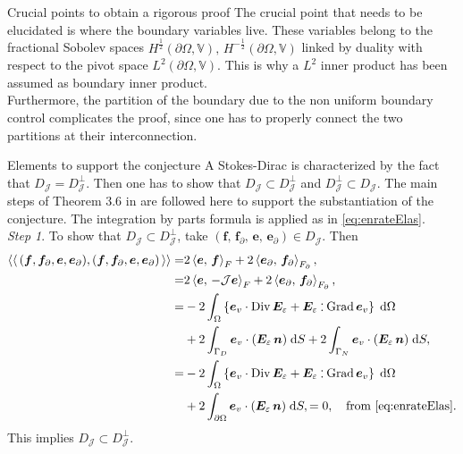\begin{conjecture}
\begin{paragraph}{Crucial points to obtain a rigorous proof}
	The crucial point that needs to be elucidated is where the boundary variables live. These variables belong to the fractional Sobolev spaces $H^{\frac{1}{2}}(\partial\Omega, \mathbb{V}), \, H^{-\frac{1}{2}}(\partial\Omega, \mathbb{V})$ linked by duality with respect to the pivot space $L^2(\partial\Omega, \mathbb{V})$. This is why a $L^2$ inner product has been assumed as boundary inner product. \\
	Furthermore, the partition of the boundary due to the non uniform boundary control complicates the proof, since one has to properly connect the two partitions at their interconnection.
\end{paragraph}
\begin{paragraph}{Elements to support the conjecture}
A Stokes-Dirac is characterized by the fact that ${D}_{\mathcal{J}} = {D}_{\mathcal{J}}^\perp$. Then one has to show that ${D}_{\mathcal{J}} \subset {D}_{\mathcal{J}}^\perp$ and ${D}_{\mathcal{J}}^\perp \subset {D}_{\mathcal{J}}$. The main steps of Theorem 3.6 in \cite{legorrec2005} are followed here to support the substantiation of the conjecture. The integration by parts formula is applied as in \eqref{eq:enrateElas}. \\

\textit{Step 1}. To show that ${D}_{\mathcal{J}} \subset {D}_{\mathcal{J}}^\perp$, take $(\bm{f}, \, \bm{f}_\partial, \, \bm{e}, \, \bm{e}_\partial) \in {D}_{\mathcal{J}}$. Then
\begin{align*}
\bilprod{(\bm{f}, \bm{f}_{\partial}, \bm{e}, \bm{e}_{\partial})}{(\bm{f}, \bm{f}_{\partial}, \bm{e}, \bm{e}_{\partial})} =& 2 \inner[F]{\bm{e}}{\bm{f}} + 2 \inner[F_\partial]{\bm{e}_{\partial}}{\bm{f}_{\partial}}, \\
=& 2 \inner[F]{\bm{e}}{-\mathcal{J}\bm{e}} + 2 \inner[F_\partial]{\bm{e}_{\partial}}{\bm{f}_{\partial}}, \\
=& - 2 \int_{\Omega} \left\{\bm{e}_v \cdot \Div \bm{E}_\varepsilon + \bm{E}_\varepsilon \cddot \Grad \bm{e}_v \right\}\d\Omega\\
&+ 2 \int_{\Gamma_D} \bm{e}_v \cdot (\bm{E}_\varepsilon \, \bm{n}) \d{S} + 2 \int_{\Gamma_N} \bm{e}_v \cdot (\bm{E}_\varepsilon \, \bm{n}) \d{S}, \\
=& - 2 \int_{\Omega} \left\{\bm{e}_v \cdot \Div \bm{E}_\varepsilon + \bm{E}_\varepsilon \cddot \Grad \bm{e}_v \right\}\d\Omega\\
&+ 2 \int_{\partial\Omega} \bm{e}_v \cdot (\bm{E}_\varepsilon \, \bm{n}) \d{S},
= 0, \quad \text{from \eqref{eq:enrateElas}}.
\end{align*}
This implies ${D}_{\mathcal{J}} \subset {D}_{\mathcal{J}}^\perp$.


\end{paragraph}
\end{conjecture}
